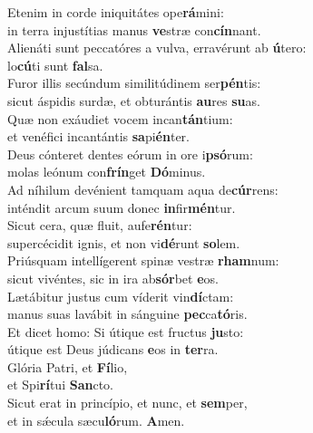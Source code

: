 \evenverse Etenim in corde iniquitátes ope\textbf{rá}mini:~\*\\
\evenverse in terra injustítias manus \textbf{ve}stræ con\textbf{cín}nant.\\
\oddverse Alienáti sunt peccatóres a vulva, erravérunt ab \textbf{ú}tero:~\*\\
\oddverse lo\textbf{cú}ti sunt \textbf{fal}sa.\\
\evenverse Furor illis secúndum similitúdinem ser\textbf{pén}tis:~\*\\
\evenverse sicut áspidis surdæ, et obturántis \textbf{au}res \textbf{su}as.\\
\oddverse Quæ non exáudiet vocem incan\textbf{tán}tium:~\*\\
\oddverse et venéfici incantántis \textbf{sa}pi\textbf{én}ter.\\
\evenverse Deus cónteret dentes eórum in ore i\textbf{psó}rum:~\*\\
\evenverse molas leónum con\textbf{frín}get \textbf{Dó}minus.\\
\oddverse Ad níhilum devénient tamquam aqua de\textbf{cúr}rens:~\*\\
\oddverse inténdit arcum suum donec \textbf{in}fir\textbf{mén}tur.\\
\evenverse Sicut cera, quæ fluit, aufe\textbf{rén}tur:~\*\\
\evenverse supercécidit ignis, et non vi\textbf{dé}runt \textbf{so}lem.\\
\oddverse Priúsquam intellígerent spinæ vestræ \textbf{rham}num:~\*\\
\oddverse sicut vivéntes, sic in ira ab\textbf{sór}bet \textbf{e}os.\\
\evenverse Lætábitur justus cum víderit vin\textbf{dí}ctam:~\*\\
\evenverse manus suas lavábit in sánguine \textbf{pec}ca\textbf{tó}ris.\\
\oddverse Et dicet homo: Si útique est fructus \textbf{ju}sto:~\*\\
\oddverse útique est Deus júdicans \textbf{e}os in \textbf{ter}ra.\\
\evenverse Glória Patri, et \textbf{Fí}lio,~\*\\
\evenverse et Spi\textbf{rí}tui \textbf{San}cto.\\
\oddverse Sicut erat in princípio, et nunc, et \textbf{sem}per,~\*\\
\oddverse et in sǽcula sæcu\textbf{ló}rum. \textbf{A}men.\\
